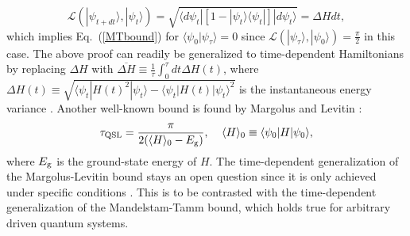 \documentclass{tADP2e}
\theoremstyle{plain}
\theoremstyle{plain}
\theoremstyle{definition}
\begin{document}
\begin{equation}
\mathcal{L}(|\psi_{t+dt}\rangle,|\psi_t\rangle)=\sqrt{\langle d\psi_t|[1-|\psi_t\rangle\langle\psi_t|]|d\psi_t\rangle}=\Delta H dt,
\label{dcalL}
\end{equation}
which implies Eq.~(\ref{MTbound}) for $\langle\psi_0|\psi_\tau\rangle=0$ since $\mathcal{L}(|\psi_\tau\rangle,|\psi_0\rangle)=\frac{\pi}{2}$ in this case. The above proof can readily be generalized to time-dependent Hamiltonians by replacing $\Delta H$ with $\overline{\Delta H}\equiv\frac{1}{\tau}\int^\tau_0dt\Delta H(t)$, where $\Delta H(t)\equiv \sqrt{\langle\psi_t| H(t)^2|\psi_t\rangle-\langle\psi_t| H(t)|\psi_t\rangle^2}$ is the instantaneous energy variance \cite{SD13}. Another well-known bound is found by Margolus and Levitin \cite{LBL98}:
\begin{equation}
\tau_{\rm QSL}=\frac{\pi}{2(\langle H\rangle_0-E_{\rm g})},\;\;\;\;\langle H\rangle_0\equiv\langle\psi_0|H|\psi_0\rangle,
\end{equation}  
where $E_{\rm g}$ is the ground-state energy of $H$. The time-dependent generalization of the Margolus-Levitin bound stays an open question since it is only achieved under specific conditions \cite{SS19}.   This is to be contrasted with the time-dependent generalization of the Mandelstam-Tamm bound, which holds true for arbitrary driven quantum systems.
\end{document}
